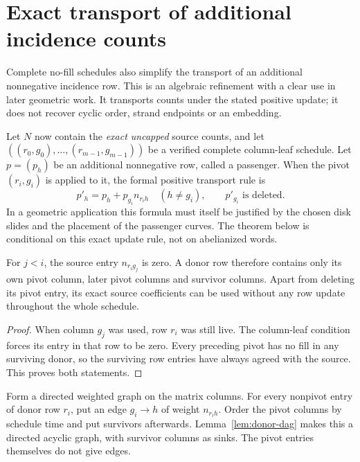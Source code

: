 \section{Exact transport of additional incidence counts}
\label{sec:passengers}

Complete no-fill schedules also simplify the transport of an additional
nonnegative incidence row. This is an algebraic refinement with a clear
use in later geometric work. It transports counts under the stated positive
update; it does not recover cyclic order, strand endpoints or an embedding.

Let $N$ now contain the \emph{exact uncapped} source counts, and let
$((r_0,g_0),\ldots,(r_{m-1},g_{m-1}))$ be a verified complete
column-leaf schedule. Let $p=(p_h)$ be an additional nonnegative row, called
a passenger. When the pivot $(r_i,g_i)$ is applied to it, the formal positive
transport rule is
\begin{equation}\label{eq:passenger-update}
 p'_h=p_h+p_{g_i}n_{r_i h}\quad(h\ne g_i),
 \qquad p'_{g_i}\text{ is deleted}.
\end{equation}
In a geometric application this formula must itself be justified by the
chosen disk slides and the placement of the passenger curves. The theorem
below is conditional on this exact update rule, not on abelianized words.

\begin{lemma}
\label{lem:donor-dag}
For $j<i$, the source entry $n_{r_i g_j}$ is zero. A donor row therefore
contains only its own pivot column, later pivot columns and survivor
columns. Apart from deleting its pivot entry, its exact source coefficients
can be used without any row update throughout the whole schedule.
\end{lemma}

\begin{proof}
When column $g_j$ was used, row $r_i$ was still live. The column-leaf
condition forces its entry in that row to be zero. Every preceding pivot
has no fill in any surviving donor, so the surviving row entries have
always agreed with the source. This proves both statements.
\end{proof}

Form a directed weighted graph on the matrix columns. For every nonpivot
entry of donor row $r_i$, put an edge $g_i\to h$ of weight $n_{r_i h}$.
Order the pivot columns by schedule time and put survivors afterwards.
Lemma~\ref{lem:donor-dag} makes this a directed acyclic graph, with survivor
columns as sinks. The pivot entries themselves do not give edges.

